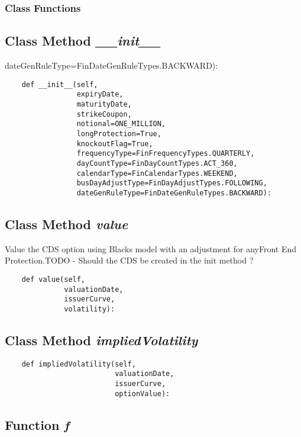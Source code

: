 \documentclass[twoside,11pt]{book}
\begin{document}
\subsubsection{Class Functions}

\subsection{Class Method {\it \_\_init\_\_}}
dateGenRuleType=FinDateGenRuleTypes.BACKWARD):

\begin{lstlisting}
    def __init__(self,
                 expiryDate,
                 maturityDate,
                 strikeCoupon,
                 notional=ONE_MILLION,
                 longProtection=True,
                 knockoutFlag=True,
                 frequencyType=FinFrequencyTypes.QUARTERLY,
                 dayCountType=FinDayCountTypes.ACT_360,
                 calendarType=FinCalendarTypes.WEEKEND,
                 busDayAdjustType=FinDayAdjustTypes.FOLLOWING,
                 dateGenRuleType=FinDateGenRuleTypes.BACKWARD):
\end{lstlisting}

\subsection{Class Method {\it value}}
Value the CDS option using Blacks model with an adjustment for anyFront End Protection.TODO - Should the CDS be created in the init method ? 

\begin{lstlisting}
    def value(self,
              valuationDate,
              issuerCurve,
              volatility):
\end{lstlisting}

\subsection{Class Method {\it impliedVolatility}}


\begin{lstlisting}
    def impliedVolatility(self,
                          valuationDate,
                          issuerCurve,
                          optionValue):
\end{lstlisting}

\subsection{Function {\it f}}
\end{document}
